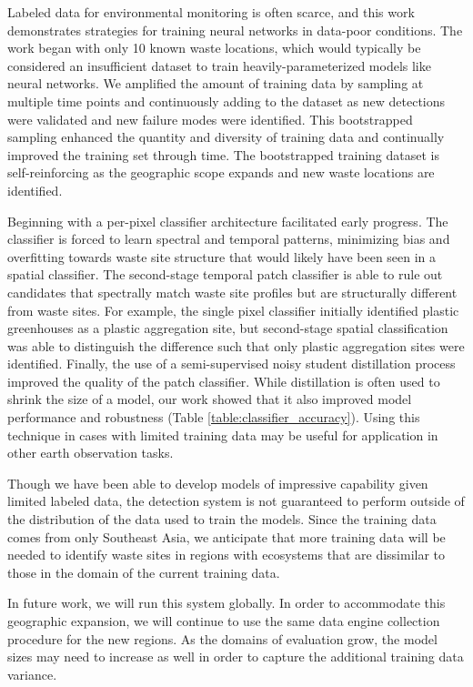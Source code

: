 \documentclass[10pt,letterpaper]{article}
\begin{document}
Labeled data for environmental monitoring is often scarce, and this work demonstrates strategies for training neural networks in data-poor conditions. The work began with only 10 known waste locations, which would typically be considered an insufficient dataset to train heavily-parameterized models like neural networks. We amplified the amount of training data by sampling at multiple time points and continuously adding to the dataset as new detections were validated and new failure modes were identified. This bootstrapped sampling enhanced the quantity and diversity of training data and continually improved the training set through time. The bootstrapped training dataset is self-reinforcing as the geographic scope expands and new waste locations are identified.

Beginning with a per-pixel classifier architecture facilitated early progress. The classifier is forced to learn spectral and temporal patterns, minimizing bias and overfitting towards waste site structure that would likely have been seen in a spatial classifier. The second-stage temporal patch classifier is able to rule out candidates that spectrally match waste site profiles but are structurally different from waste sites. For example, the single pixel classifier initially identified plastic greenhouses as a plastic aggregation site, but second-stage spatial classification was able to distinguish the difference such that only plastic aggregation sites were identified. Finally, the use of a semi-supervised noisy student distillation process improved the quality of the patch classifier. While distillation is often used to shrink the size of a model, our work showed that it also improved model performance and robustness (Table \ref{table:classifier_accuracy}). Using this technique in cases with limited training data may be useful for application in other earth observation tasks.

Though we have been able to develop models of impressive capability given limited labeled data, the detection system is not guaranteed to perform outside of the distribution of the data used to train the models. Since the training data comes from only Southeast Asia, we anticipate that more training data will be needed to identify waste sites in regions with ecosystems that are dissimilar to those in the domain of the current training data.

In future work, we will run this system globally. In order to accommodate this geographic expansion, we will continue to use the same data engine collection procedure for the new regions. As the domains of evaluation grow, the model sizes may need to increase as well in order to capture the additional training data variance.
\end{document}
